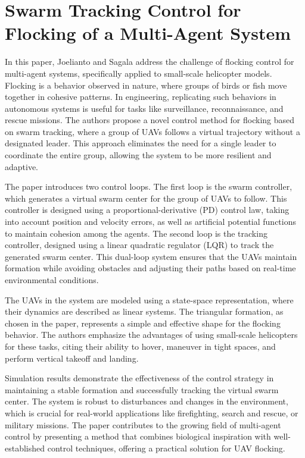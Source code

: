 \documentclass[a4paper,12pt]{article}
\begin{document}
    \section{Swarm Tracking Control for Flocking of a Multi-Agent System \cite{joelianto2012swarm}}
    In this paper, Joelianto and Sagala address the challenge of flocking control for multi-agent systems, specifically applied to small-scale helicopter models. Flocking is a behavior observed in nature, where groups of birds or fish move together in cohesive patterns. In engineering, replicating such behaviors in autonomous systems is useful for tasks like surveillance, reconnaissance, and rescue missions. The authors propose a novel control method for flocking based on swarm tracking, where a group of UAVs follows a virtual trajectory without a designated leader. This approach eliminates the need for a single leader to coordinate the entire group, allowing the system to be more resilient and adaptive.
    
    The paper introduces two control loops. The first loop is the swarm controller, which generates a virtual swarm center for the group of UAVs to follow. This controller is designed using a proportional-derivative (PD) control law, taking into account position and velocity errors, as well as artificial potential functions to maintain cohesion among the agents. The second loop is the tracking controller, designed using a linear quadratic regulator (LQR) to track the generated swarm center. This dual-loop system ensures that the UAVs maintain formation while avoiding obstacles and adjusting their paths based on real-time environmental conditions.
    
    The UAVs in the system are modeled using a state-space representation, where their dynamics are described as linear systems. The triangular formation, as chosen in the paper, represents a simple and effective shape for the flocking behavior. The authors emphasize the advantages of using small-scale helicopters for these tasks, citing their ability to hover, maneuver in tight spaces, and perform vertical takeoff and landing.
    
    Simulation results demonstrate the effectiveness of the control strategy in maintaining a stable formation and successfully tracking the virtual swarm center. The system is robust to disturbances and changes in the environment, which is crucial for real-world applications like firefighting, search and rescue, or military missions. The paper contributes to the growing field of multi-agent control by presenting a method that combines biological inspiration with well-established control techniques, offering a practical solution for UAV flocking.
    
\end{document}
